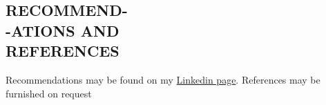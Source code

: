 \documentclass[margin, 10pt]{res} %
\begin{document}
\begin{resume}
\section{RECOMMEND- \\-ATIONS AND \\ REFERENCES } 
Recommendations may be found on my \href{https://www.linkedin.com/in/ikramu/}{Linkedin page}. References may be furnished on request
\begin{comment}
\begin{itemize}
\item Dr. Jens Lagergren \\
Professor in computer science and computational biology \\
KTH \& Scilifelab Stockholm \\
\href{http://www.nada.kth.se/~jensl/}{http://www.nada.kth.se/$\sim$jensl/} 

\item Dr. Lars Arvestad \\
Senior lecturer in computational biology \\
Stockholm University \& Scilifelab Stockholm \\
\hfill \href{http://www.nada.kth.se/~arve/}{http://www.nada.kth.se/$\sim$arve/}
\end{itemize}
\end{comment}

\end{resume}
\end{document}
